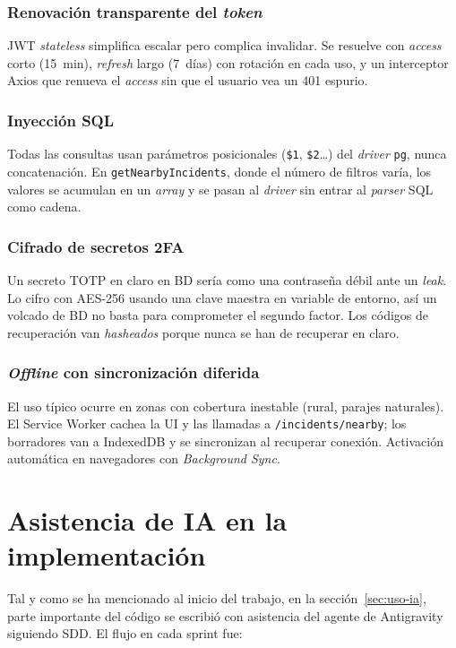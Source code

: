 \subsubsection*{Renovación transparente del \textit{token}}
  JWT \textit{stateless} simplifica escalar pero complica invalidar. Se resuelve con \textit{access} corto (15~min), \textit{refresh} largo (7~días) con rotación en cada uso, y un interceptor Axios que renueva el \textit{access} sin que el usuario vea un 401 espurio.

\subsubsection*{Inyección SQL}
  Todas las consultas usan parámetros posicionales (\texttt{\$1}, \texttt{\$2}\dots) del \textit{driver} \texttt{pg}, nunca concatenación. En \texttt{getNearbyIncidents}, donde el número de filtros varía, los valores se acumulan en un \textit{array} y se pasan al \textit{driver} sin entrar al \textit{parser} SQL como cadena.

\subsubsection*{Cifrado de secretos 2FA}
  Un secreto TOTP en claro en BD sería como una contraseña débil ante un \textit{leak}. Lo cifro con AES-256 usando una clave maestra en variable de entorno, así un volcado de BD no basta para comprometer el segundo factor. Los códigos de recuperación van \textit{hasheados} porque nunca se han de recuperar en claro.

\subsubsection*{\textit{Offline} con sincronización diferida}
  El uso típico ocurre en zonas con cobertura inestable (rural, parajes naturales). El Service Worker cachea la UI y las llamadas a \texttt{/incidents/nearby}; los borradores van a IndexedDB y se sincronizan al recuperar conexión. Activación automática en navegadores con \textit{Background Sync}.


\section{Asistencia de IA en la implementación}
\label{sec:ia-implementacion}

Tal y como se ha mencionado al inicio del trabajo, en la sección~\ref{sec:uso-ia}, parte importante del código se escribió con asistencia del agente de Antigravity siguiendo SDD. El flujo en cada sprint fue:

